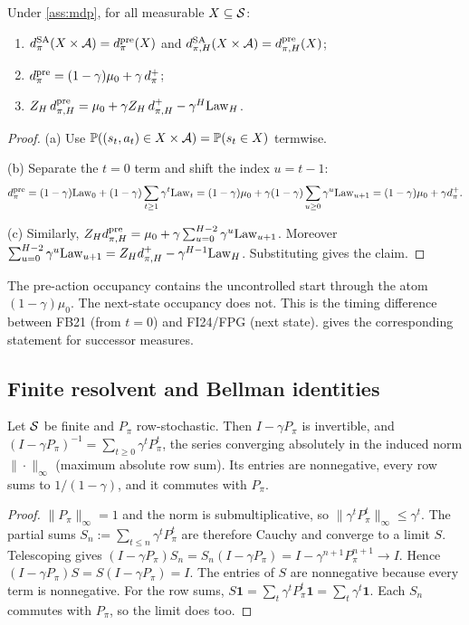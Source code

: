 \begin{proposition}\label{prop:occ-shift}
Under \cref{ass:mdp}, for all measurable $X\subseteq\mathcal{S}$:
\begin{enumerate}[nosep,label=(\alph*)]
\item $d^{\mathrm{SA}}_\pi(X\times\mathcal{A})=d^{\mathrm{pre}}_\pi(X)$ and $d^{\mathrm{SA}}_{\pi,H}(X\times\mathcal{A})=d^{\mathrm{pre}}_{\pi,H}(X)$;
\item $d^{\mathrm{pre}}_\pi=(1-\gamma)\mu_0+\gamma\,d^+_\pi$;
\item $Z_H\,d^{\mathrm{pre}}_{\pi,H}=\mu_0+\gamma Z_H\,d^+_{\pi,H}-\gamma^H\mathrm{Law}_H$.
\end{enumerate}
\end{proposition}
\begin{proof}
(a) Use $\mathbb{P}((s_t,a_t)\in X\times\mathcal{A})=\mathbb{P}(s_t\in X)$ termwise.

(b) Separate the $t=0$ term and shift the index $u=t-1$:
\[
d^{\mathrm{pre}}_\pi=(1-\gamma)\mathrm{Law}_0+(1-\gamma)\sum_{t\ge1}\gamma^t\mathrm{Law}_t
=(1-\gamma)\mu_0+\gamma(1-\gamma)\sum_{u\ge0}\gamma^u\mathrm{Law}_{u+1}=(1-\gamma)\mu_0+\gamma d^+_\pi.
\]

(c) Similarly,
$Z_Hd^{\mathrm{pre}}_{\pi,H}=\mu_0+\gamma\sum_{u=0}^{H-2}\gamma^u\mathrm{Law}_{u+1}$.
Moreover $\sum_{u=0}^{H-2}\gamma^u\mathrm{Law}_{u+1}=Z_Hd^+_{\pi,H}-\gamma^{H-1}\mathrm{Law}_H$.
Substituting gives the claim.
\end{proof}

\begin{remark}
The pre-action occupancy contains the uncontrolled start through the atom $(1-\gamma)\mu_0$.
The next-state occupancy does not.
This is the timing difference between FB21 (from $t=0$) and FI24/FPG (next state).
 gives the corresponding statement for successor measures.
\end{remark}

\subsection{Finite resolvent and Bellman identities}\label{sec:occ-resolvent}

\begin{lemma}\label{lem:neumann}
Let $\mathcal{S}$ be finite and $P_\pi$ row-stochastic.
Then $I-\gamma P_\pi$ is invertible, and
$(I-\gamma P_\pi)^{-1}=\sum_{t\ge0}\gamma^tP_\pi^t$, the series converging absolutely in the induced norm $\|\cdot\|_\infty$ (maximum absolute row sum).
Its entries are nonnegative, every row sums to $1/(1-\gamma)$, and it commutes with $P_\pi$.
\end{lemma}
\begin{proof}
$\|P_\pi\|_\infty=1$ and the norm is submultiplicative, so $\|\gamma^tP_\pi^t\|_\infty\le\gamma^t$.
The partial sums $S_n:=\sum_{t\le n}\gamma^tP_\pi^t$ are therefore Cauchy and converge to a limit $S$.
Telescoping gives $(I-\gamma P_\pi)S_n=S_n(I-\gamma P_\pi)=I-\gamma^{n+1}P_\pi^{n+1}\to I$.
Hence $(I-\gamma P_\pi)S=S(I-\gamma P_\pi)=I$.
The entries of $S$ are nonnegative because every term is nonnegative.
For the row sums, $S\mathbf 1=\sum_t\gamma^tP_\pi^t\mathbf 1=\sum_t\gamma^t\mathbf 1$.
Each $S_n$ commutes with $P_\pi$, so the limit does too.
\end{proof}


